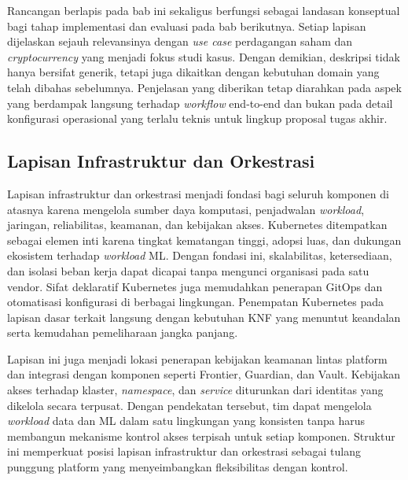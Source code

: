 Rancangan berlapis pada bab ini sekaligus berfungsi sebagai landasan konseptual bagi tahap implementasi dan evaluasi pada bab berikutnya. Setiap lapisan dijelaskan sejauh relevansinya dengan \textit{use case} perdagangan saham dan \textit{cryptocurrency} yang menjadi fokus studi kasus. Dengan demikian, deskripsi tidak hanya bersifat generik, tetapi juga dikaitkan dengan kebutuhan domain yang telah dibahas sebelumnya. Penjelasan yang diberikan tetap diarahkan pada aspek yang berdampak langsung terhadap \textit{workflow} end-to-end dan bukan pada detail konfigurasi operasional yang terlalu teknis untuk lingkup proposal tugas akhir.

\subsection{Lapisan Infrastruktur dan Orkestrasi}

Lapisan infrastruktur dan orkestrasi menjadi fondasi bagi seluruh komponen di atasnya karena mengelola sumber daya komputasi, penjadwalan \textit{workload}, jaringan, reliabilitas, keamanan, dan kebijakan akses. Kubernetes ditempatkan sebagai elemen inti karena tingkat kematangan tinggi, adopsi luas, dan dukungan ekosistem terhadap \textit{workload} ML. Dengan fondasi ini, skalabilitas, ketersediaan, dan isolasi beban kerja dapat dicapai tanpa mengunci organisasi pada satu vendor. Sifat deklaratif Kubernetes juga memudahkan penerapan GitOps dan otomatisasi konfigurasi di berbagai lingkungan. Penempatan Kubernetes pada lapisan dasar terkait langsung dengan kebutuhan KNF yang menuntut keandalan serta kemudahan pemeliharaan jangka panjang.

Lapisan ini juga menjadi lokasi penerapan kebijakan keamanan lintas platform dan integrasi dengan komponen seperti Frontier, Guardian, dan Vault. Kebijakan akses terhadap klaster, \textit{namespace}, dan \textit{service} diturunkan dari identitas yang dikelola secara terpusat. Dengan pendekatan tersebut, tim dapat mengelola \textit{workload} data dan ML dalam satu lingkungan yang konsisten tanpa harus membangun mekanisme kontrol akses terpisah untuk setiap komponen. Struktur ini memperkuat posisi lapisan infrastruktur dan orkestrasi sebagai tulang punggung platform yang menyeimbangkan fleksibilitas dengan kontrol.

